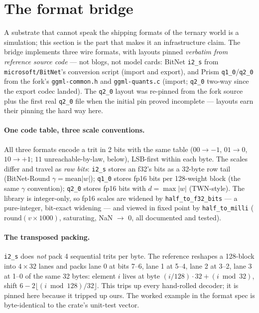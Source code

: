 \section{The format bridge}
\label{sec:bridge}

A substrate that cannot speak the shipping formats of the ternary
world is a simulation; this section is the part that makes it an
infrastructure claim. The bridge implements three wire formats, with
layouts pinned \emph{verbatim from reference source code} --- not
blogs, not model cards: BitNet \texttt{i2\_s} from
\texttt{microsoft/BitNet}'s conversion script (import and export),
and Prism \texttt{q1\_0}/\texttt{q2\_0} from the fork's
\texttt{ggml-common.h} and \texttt{ggml-quants.c} (import;
\texttt{q2\_0} two-way since the export codec landed). The
\texttt{q2\_0} layout was re-pinned from the fork source plus the
first real \texttt{q2\_0} file when the initial pin proved
incomplete --- layouts earn their pinning the hard way here.

\paragraph{One code table, three scale conventions.}
All three formats encode a trit in 2 bits with the same table
($00 \to -1$, $01 \to 0$, $10 \to +1$; $11$ unreachable-by-law,
below), LSB-first within each byte. The scales differ and travel as
\emph{raw bits}: \texttt{i2\_s} stores an f32's bits as a 32-byte row
tail (BitNet-Round $\gamma = \mathrm{mean}|w|$); \texttt{q1\_0}
stores fp16 bits per 128-weight block (the same $\gamma$ convention);
\texttt{q2\_0} stores fp16 bits with $d = \max|w|$ (TWN-style). The
library is integer-only, so fp16 scales are widened by
\texttt{half\_to\_f32\_bits} --- a pure-integer, bit-exact widening
--- and viewed in fixed point by \texttt{half\_to\_milli}
($\mathrm{round}(v \times 1000)$, saturating, NaN $\to$ 0, all
documented and tested).

\paragraph{The transposed packing.}
\texttt{i2\_s} does \emph{not} pack 4 sequential trits per byte. The
reference reshapes a 128-block into $4 \times 32$ lanes and packs lane
0 at bits 7--6, lane 1 at 5--4, lane 2 at 3--2, lane 3 at 1--0 of the
same 32 bytes: element $i$ lives at byte
$(i/128)\cdot 32 + (i \bmod 32)$, shift $6 - 2\lfloor (i \bmod
128)/32 \rfloor$. This trips up every hand-rolled decoder; it is
pinned here because it tripped up ours. The worked example in the
format spec is byte-identical to the crate's unit-test vector.

